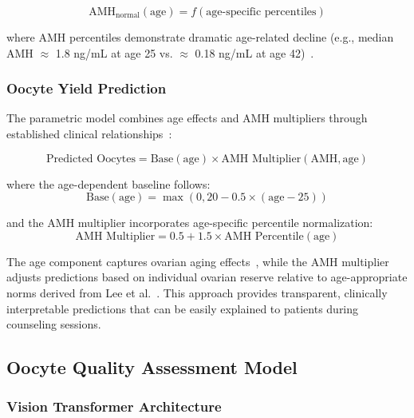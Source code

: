 \begin{equation}
\text{AMH}_{\text{normal}}(\text{age}) = f(\text{age-specific percentiles})
\end{equation}

where AMH percentiles demonstrate dramatic age-related decline (e.g., median AMH $\approx$ 1.8 ng/mL at age 25 vs. $\approx$ 0.18 ng/mL at age 42)~\cite{lee2017amh}.

\subsubsection{Oocyte Yield Prediction}

The parametric model combines age effects and AMH multipliers through established clinical relationships~\cite{seifer2002amh,ovarian_reserve_testing}:

\begin{equation}
\text{Predicted Oocytes} = \text{Base}(\text{age}) \times \text{AMH Multiplier}(\text{AMH}, \text{age})
\end{equation}

where the age-dependent baseline follows:
\begin{equation}
\text{Base}(\text{age}) = \max(0, 20 - 0.5 \times (\text{age} - 25))
\end{equation}

and the AMH multiplier incorporates age-specific percentile normalization:
\begin{equation}
\text{AMH Multiplier} = 0.5 + 1.5 \times \text{AMH Percentile}(\text{age})
\end{equation}

The age component captures ovarian aging effects~\cite{acog2017advanced}, while the AMH multiplier adjusts predictions based on individual ovarian reserve relative to age-appropriate norms derived from Lee et al.~\cite{lee2017amh}. This approach provides transparent, clinically interpretable predictions that can be easily explained to patients during counseling sessions.

\subsection{Oocyte Quality Assessment Model}\label{subsec:quality}

\subsubsection{Vision Transformer Architecture}

